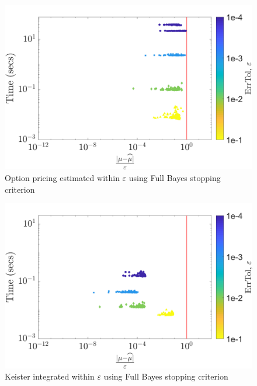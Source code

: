 \documentclass[twocolumn]{svjour3}          %
\begin{document}
\begin{figure}
	\centering
	\includegraphics[width=0.95\linewidth]{"figures/optPrice_guaranteed_time_FB_Baker_29-Jul-2018 04-03-05"}
	\caption[OptPrice guaranteed : Number of samples]{Option pricing estimated within $\varepsilon$ using Full Bayes stopping criterion}
	\label{fig:optprice-guaranteed-FB}
\end{figure}
\begin{figure}
	\centering
	\includegraphics[width=0.95\linewidth]{"figures/Keister_guaranteed_time_FB_C2sin_29-Jul-2018 03-11-01"}
	\caption[Keister guaranteed: Num sample]{Keister integrated within $\varepsilon$ using Full Bayes stopping criterion}
	\label{fig:keister-guaranteed-FB}
\end{figure}
\end{document}
